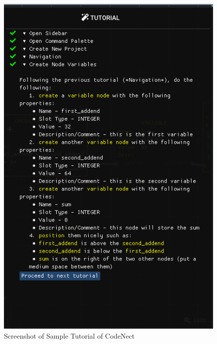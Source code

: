 \begin{figure}[H]
	\centering
	\captionsetup{justification=centering}
	\captionsetup[figure]{list=yes}
	\includegraphics[width=\linewidth]{media/sc_tutorial_sample.png}
	\caption[Screenshot of Sample Tutorial of CodeNect]{Screenshot of Sample Tutorial of CodeNect}
	\label{fig:cn_tutorial_sample}
\end{figure}
